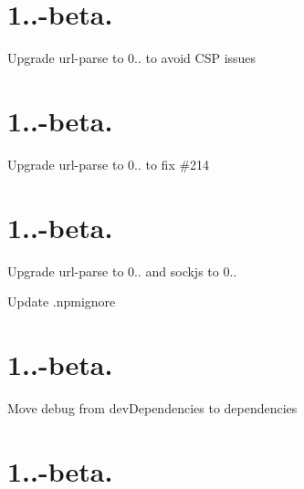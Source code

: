 \section*{1..-\/beta. }


\begin{DoxyItemize}
\item Upgrade {\ttfamily url-\/parse} to 0.. to avoid C\+SP issues
\end{DoxyItemize}

\section*{1..-\/beta. }


\begin{DoxyItemize}
\item Upgrade {\ttfamily url-\/parse} to 0.. to fix \#214
\end{DoxyItemize}

\section*{1..-\/beta. }


\begin{DoxyItemize}
\item Upgrade {\ttfamily url-\/parse} to 0.. and {\ttfamily sockjs} to 0..
\item Update .npmignore
\end{DoxyItemize}

\section*{1..-\/beta. }


\begin{DoxyItemize}
\item Move {\ttfamily debug} from dev\+Dependencies to dependencies
\end{DoxyItemize}

\section*{1..-\/beta. }


